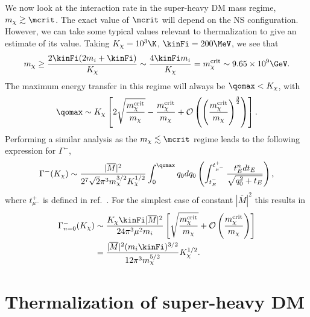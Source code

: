 We now look at the interaction rate in the super-heavy DM mass regime, $m_\chi \gtrsim \mcrit$.
The exact value of $\mcrit$ will depend on the NS configuration. However, we can take some typical values relevant to thermalization to give an estimate of its value. Taking $K_\chi=10^3\K$, $\kinFi=200\MeV$, we see that
\begin{equation}
    m_\chi \ge \frac{2\kinFi(2m_i+\kinFi)}{ K_\chi} \sim \frac{4\kinFi m_i}{K_\chi} = m_\chi^{\rm crit}\sim 9.65\times10^9\GeV. 
\end{equation}
The maximum energy transfer in this regime will always be $\qomax<K_\chi$, with
\begin{equation}
    \qomax\sim K_\chi\left[2\sqrt{\frac{m_\chi^{\rm crit}}{m_\chi }} - \frac{m_\chi^{\rm crit}}{m_\chi } +\mathcal{O}\left(\left(\frac{m_\chi^{\rm crit}}{m_\chi}\right)^{\frac{3}{2}}\right)\right].
 \end{equation}
Performing a similar analysis as the $m_\chi \lesssim \mcrit$ regime leads to the following expression for $\Gamma^-$,
\begin{equation}
\Gamma^{-}(K_\chi) \sim \frac{|\overline{M}|^2}{2^7\sqrt{2}\pi^3m_\chi^{3/2}K_\chi^{1/2}}\int_0^{	\qomax}q_0 dq_0 \left(\int_{t_{E}^{-}}^{t_{\mu^-}^{+}} \frac{t_E^n dt_E }{\sqrt{q_0^2+t_E}} \right),  
\end{equation} 
where $t_{\mu^-}^+$ is defined in ref.~\cite{Bell:2020jou}. 
For the simplest case of constant $|\overline{M}|^2$ this results in 
\begin{align}
\Gamma^{-}_{n=0}(K_\chi) & \sim  
\frac{K_\chi \kinFi |\overline{M}|^2}{24\pi^3\mu^2m_i}\left[\sqrt{\frac{m_\chi^{\rm crit}}{m_\chi}}+\mathcal{O}\left(\frac{m_\chi^{\rm crit}}{m_\chi}\right)\right] \nonumber\\
& = \frac{|\overline{M}|^2(m_i\kinFi)^{3/2}}{12 \pi^3m_\chi^{5/2}}K_\chi^{1/2}.\label{eq:intraten0largem}
\end{align}

\section{Thermalization of super-heavy DM}
\label{sec:thermsuperheavy}



